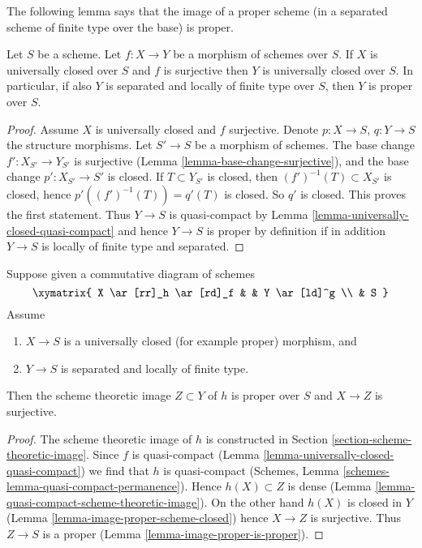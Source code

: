 \noindent
The following lemma says that the image of a proper scheme (in a separated
scheme of finite type over the base) is proper.

\begin{lemma}
\label{lemma-image-proper-is-proper}
Let $S$ be a scheme. Let $f : X \to Y$ be a morphism of schemes over $S$.
If $X$ is universally closed over $S$ and $f$ is surjective then
$Y$ is universally closed over $S$. In particular, if also $Y$ is
separated and locally of finite type over $S$, then $Y$ is proper over $S$.
\end{lemma}

\begin{proof}
Assume $X$ is universally closed and $f$ surjective.
Denote $p : X \to S$, $q : Y \to S$ the structure morphisms.
Let $S' \to S$ be a morphism of schemes. The base change
$f' : X_{S'} \to Y_{S'}$ is surjective
(Lemma \ref{lemma-base-change-surjective}), and the base
change $p' : X_{S'} \to S'$ is closed.
If $T \subset Y_{S'}$ is closed, then $(f')^{-1}(T) \subset X_{S'}$
is closed, hence $p'((f')^{-1}(T)) = q'(T)$ is closed.
So $q'$ is closed. This proves the first statement.
Thus $Y \to S$ is quasi-compact by
Lemma \ref{lemma-universally-closed-quasi-compact}
and hence $Y \to S$ is proper by definition
if in addition $Y \to S$ is locally of finite type and separated.
\end{proof}

\begin{lemma}
\label{lemma-scheme-theoretic-image-is-proper}
Suppose given a commutative diagram of schemes
$$
\xymatrix{
X \ar[rr]_h \ar[rd]_f & & Y \ar[ld]^g \\
& S
}
$$
Assume
\begin{enumerate}
\item $X \to S$ is a universally closed (for example proper) morphism, and
\item $Y \to S$ is separated and locally of finite type.
\end{enumerate}
Then the scheme theoretic image $Z \subset Y$ of $h$
is proper over $S$ and $X \to Z$ is surjective.
\end{lemma}

\begin{proof}
The scheme theoretic image of $h$ is constructed in Section
\ref{section-scheme-theoretic-image}. Since $f$ is quasi-compact
(Lemma \ref{lemma-universally-closed-quasi-compact})
we find that $h$ is quasi-compact
(Schemes, Lemma \ref{schemes-lemma-quasi-compact-permanence}).
Hence $h(X) \subset Z$
is dense (Lemma \ref{lemma-quasi-compact-scheme-theoretic-image}).
On the other hand $h(X)$ is closed in $Y$
(Lemma \ref{lemma-image-proper-scheme-closed})
hence $X \to Z$ is surjective.
Thus $Z \to S$ is a proper (Lemma \ref{lemma-image-proper-is-proper}).
\end{proof}

